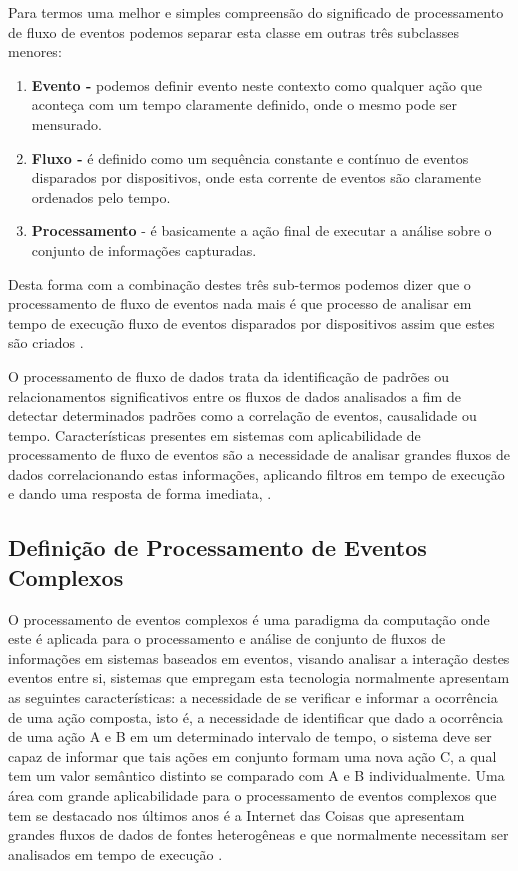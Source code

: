 \documentclass[tid,table]{texufpel} %
\begin{document}
Para termos uma melhor e simples compreensão do significado de processamento de fluxo de eventos podemos separar esta classe em outras três subclasses menores:
\begin{enumerate}
	\item  \textbf{Evento -} podemos definir evento neste contexto como qualquer ação que aconteça com um tempo claramente definido, onde o mesmo pode ser mensurado.  
	
	\item  \textbf{Fluxo -} é definido como um sequência constante e contínuo de eventos disparados por dispositivos, onde esta corrente de eventos são claramente ordenados pelo tempo.
	
	\item  \textbf{Processamento} - é basicamente a ação final de executar a análise sobre o conjunto de informações capturadas.
\end{enumerate}
Desta forma com a combinação destes três sub-termos podemos dizer que o processamento de fluxo de eventos nada mais é que processo de analisar em tempo de execução fluxo de eventos disparados por dispositivos assim que estes são criados \cite{dayarathna2018recent}. 

O processamento de fluxo de dados trata da identificação de padrões ou relacionamentos significativos entre os fluxos de dados analisados a fim de detectar determinados padrões como a correlação de eventos, causalidade ou tempo.
Características presentes em sistemas com aplicabilidade de processamento de fluxo de eventos são a necessidade de analisar grandes fluxos de dados correlacionando estas informações, aplicando filtros em tempo de execução e dando uma resposta de forma imediata, \cite{appel2013event}.



\subsection{Definição de Processamento de Eventos Complexos}
O processamento de eventos complexos é uma paradigma da computação onde este é aplicada para o processamento e análise de conjunto de fluxos de informações em sistemas baseados em eventos, visando analisar a interação destes eventos entre si, sistemas que empregam esta tecnologia normalmente apresentam as seguintes características: a necessidade de se verificar e informar a ocorrência de uma ação composta, isto é, a necessidade de identificar que dado a ocorrência de uma ação A e B em um determinado intervalo de tempo, o sistema deve ser capaz de informar que tais ações em conjunto formam uma nova ação C, a qual tem um valor semântico distinto se comparado com A e B individualmente. Uma área com grande aplicabilidade para o processamento de eventos complexos que tem se destacado nos últimos anos é a Internet das Coisas que apresentam grandes fluxos de dados de fontes heterogêneas e que normalmente necessitam ser analisados em tempo de execução \cite{jun2014design}. 
\end{document}
